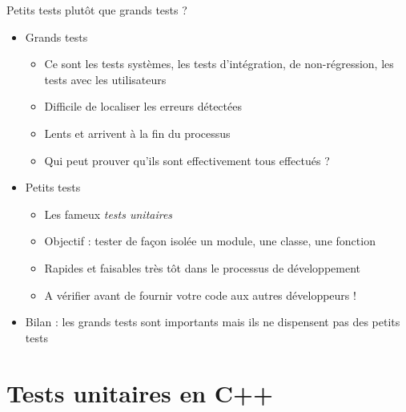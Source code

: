 \begin{frame}{Petits tests plutôt que grands tests ?}

\begin{itemize}
\itemsep1pt\parskip0pt
\item
  Grands tests

  \begin{itemize}
  \itemsep1pt\parskip0pt
  \item
    Ce sont les tests systèmes, les tests d'intégration, de
    non-régression, les tests avec les utilisateurs
  \item
    Difficile de localiser les erreurs détectées
  \item
    Lents et arrivent à la fin du processus
  \item
    Qui peut prouver qu'ils sont effectivement tous effectués ?
  \end{itemize}
\item
  Petits tests

  \begin{itemize}
  \itemsep1pt\parskip0pt
  \item
    Les fameux \emph{tests unitaires}
  \item
    Objectif : tester de façon isolée un module, une classe, une
    fonction
  \item
    Rapides et faisables très tôt dans le processus de développement
  \item
    A vérifier avant de fournir votre code aux autres développeurs !
  \end{itemize}
\item
  Bilan : les grands tests sont importants mais ils ne dispensent pas
  des petits tests
\end{itemize}

\end{frame}

\section{Tests unitaires en C++}



